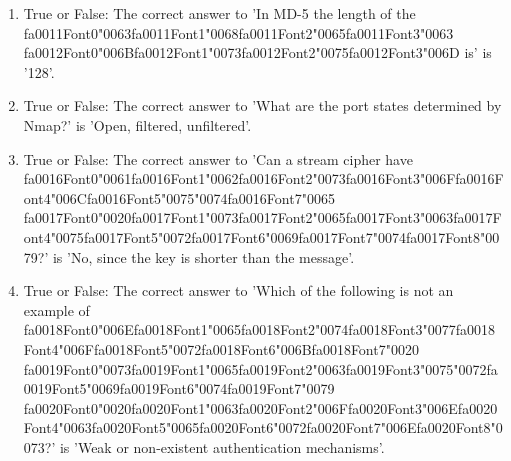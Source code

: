 \documentclass[12pt]{article}
\begin{document}
\begin{enumerate}[label=\arabic*.]
\item True or False: The correct answer to 'In MD-5 the length of the {\csname fa0011Font0\endcsname\char"0063}{\csname fa0011Font1\endcsname\char"0068}{\csname fa0011Font2\endcsname\char"0065}{\csname fa0011Font3\endcsname\char"0063} {\csname fa0012Font0\endcsname\char"006B}{\csname fa0012Font1\endcsname\char"0073}{\csname fa0012Font2\endcsname\char"0075}{\csname fa0012Font3\endcsname\char"006D} is' is '128'.
\item True or False: The correct answer to 'What are the port states determined by Nmap?' is 'Open, filtered, unfiltered'.
\item True or False: The correct answer to 'Can a stream cipher have {\csname fa0016Font0\endcsname\char"0061}{\csname fa0016Font1\endcsname\char"0062}{\csname fa0016Font2\endcsname\char"0073}{\csname fa0016Font3\endcsname\char"006F}{\csname fa0016Font4\endcsname\char"006C}{\csname fa0016Font5\endcsname\char"0075}{\char"0074}{\csname fa0016Font7\endcsname\char"0065} {\csname fa0017Font0\endcsname\char"0020}{\csname fa0017Font1\endcsname\char"0073}{\csname fa0017Font2\endcsname\char"0065}{\csname fa0017Font3\endcsname\char"0063}{\csname fa0017Font4\endcsname\char"0075}{\csname fa0017Font5\endcsname\char"0072}{\csname fa0017Font6\endcsname\char"0069}{\csname fa0017Font7\endcsname\char"0074}{\csname fa0017Font8\endcsname\char"0079}?' is 'No, since the key is shorter than the message'.
\item True or False: The correct answer to 'Which of the following is not an example of {\csname fa0018Font0\endcsname\char"006E}{\csname fa0018Font1\endcsname\char"0065}{\csname fa0018Font2\endcsname\char"0074}{\csname fa0018Font3\endcsname\char"0077}{\csname fa0018Font4\endcsname\char"006F}{\csname fa0018Font5\endcsname\char"0072}{\csname fa0018Font6\endcsname\char"006B}{\csname fa0018Font7\endcsname\char"0020} {\csname fa0019Font0\endcsname\char"0073}{\csname fa0019Font1\endcsname\char"0065}{\csname fa0019Font2\endcsname\char"0063}{\csname fa0019Font3\endcsname\char"0075}{\char"0072}{\csname fa0019Font5\endcsname\char"0069}{\csname fa0019Font6\endcsname\char"0074}{\csname fa0019Font7\endcsname\char"0079} {\csname fa0020Font0\endcsname\char"0020}{\csname fa0020Font1\endcsname\char"0063}{\csname fa0020Font2\endcsname\char"006F}{\csname fa0020Font3\endcsname\char"006E}{\csname fa0020Font4\endcsname\char"0063}{\csname fa0020Font5\endcsname\char"0065}{\csname fa0020Font6\endcsname\char"0072}{\csname fa0020Font7\endcsname\char"006E}{\csname fa0020Font8\endcsname\char"0073}?' is 'Weak or non-existent authentication mechanisms'.

\end{enumerate}
\end{document}
